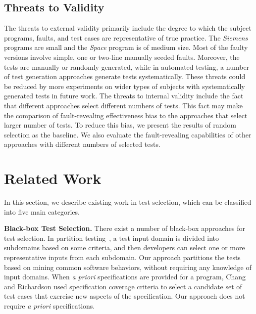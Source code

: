 \documentclass{sig-alternate}
\begin{document}
\subsection{Threats to Validity}
The threats to external validity primarily include the degree to
which the subject programs, faults, and test cases are
representative of true practice. The \emph{Siemens} programs are
small and the \emph{Space} program is of medium size. Most of the
faulty versions involve simple, one or two-line manually seeded
faults. Moreover, the tests are manually or randomly generated,
while in automated testing, a number of test generation approaches
generate tests systematically. These threats could be reduced by
more experiments on wider types of subjects with systematically
generated tests in future work. The threats to internal validity
include the fact that different approaches select different numbers
of tests. This fact may make the comparison of fault-revealing
effectiveness bias to the approaches that select larger number of
tests. To reduce this bias, we present the results of random
selection as the baseline. We also evaluate the fault-revealing
capabilities of other approaches with different numbers of selected
tests.



\section{Related Work} \label{sec:relatedwork}

In this section, we describe existing work in test selection, which
can be classified into five main categories.



\textbf{Black-box Test Selection.} There exist a number of
black-box approaches for test selection. In partition
testing~\cite{Myers79}, a test input domain is divided into
subdomains based on some criteria, and then developers can select
one or more representative inputs from each subdomain. Our approach
partitions the tests based on mining common software behaviors,
without requiring any knowledge of input domains. When \emph{a
priori} specifications are provided for a program, Chang and
Richardson \cite{Chang99} used specification coverage criteria to
select a candidate set of test cases that exercise new aspects of
the specification. Our approach does not require \emph{a priori}
specifications.

\end{document}
